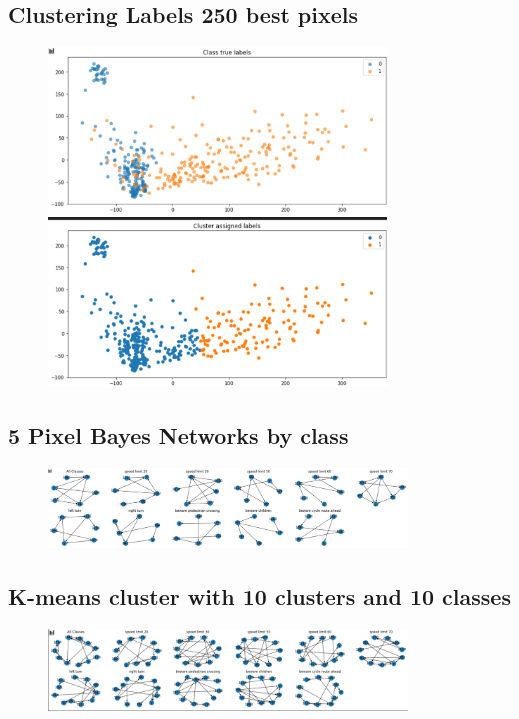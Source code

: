 \documentclass[11pt]{article}
\begin{document}
\begin{appendices}
\newpage
\subsection{Clustering Labels 250 best pixels}\label{LabelClusters2} 
\begin{figure}[h!]
  \centering
  \includegraphics[width=0.8\textwidth]{Images/LabelClusters2.png}
\end{figure}

\newpage
\subsection{5 Pixel Bayes Networks by class}\label{5PixelsNetworks} 
\begin{figure}[h!]
  \centering
  \includegraphics[width=0.85\textwidth]{Images/AllClasses.png}
\end{figure}

\subsection{K-means cluster with 10 clusters and 10 classes}\label{10pixelsNetwork} 
\begin{figure}[h!]
  \centering
  \includegraphics[width=0.85\textwidth]{images/TenPixelsBNetwork.png}
\end{figure}


\end{appendices}
\end{document}
